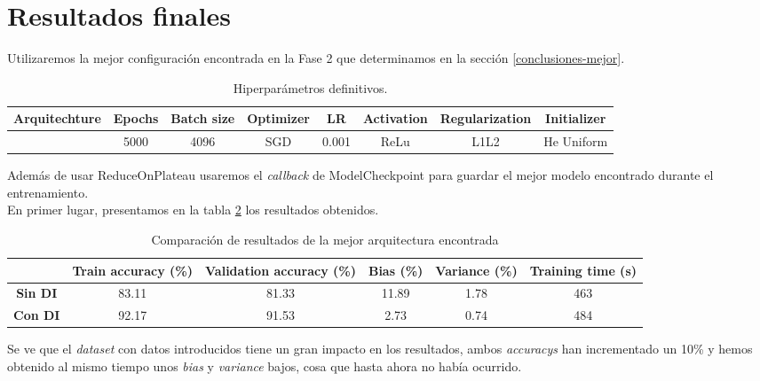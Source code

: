 \documentclass{article}
\begin{document}
\section{Resultados finales}
Utilizaremos la mejor configuraci\'on encontrada en la Fase 2 que determinamos en la secci\'on \ref{conclusiones-mejor}.\\
\begin{table}[h!]
    \begin{center}
    \begin{tabular}{| c | c | c | c | c | c | c | c |}
            \textbf{Arquitechture} & \textbf{Epochs} & \textbf{Batch size} & \textbf{Optimizer} & \textbf{LR} & \textbf{Activation} &\textbf{Regularization} & \textbf{Initializer}\\ \hline
            [32,16,8] & 5000 & 4096 & SGD & 0.001 & ReLu & L1L2 & He Uniform \\ \hline
        \end{tabular}
        \caption{Hiperpar\'ametros definitivos.}
        \label{tab:hip-j-a0-c}
    \end{center}
\end{table}
Adem\'as de usar ReduceOnPlateau usaremos el \textit{callback} de ModelCheckpoint para guardar el mejor modelo encontrado durante el entrenamiento.\\
En primer lugar, presentamos en la tabla \ref{tab:res-final} los resultados obtenidos.
			\begin{table}[!h]
				\begin{center}
					\begin{tabular}{ c | c | c | c | c | c |}
						\ & \textbf{Train accuracy (\%)} & \textbf{Validation accuracy (\%)} & \textbf{Bias (\%)} & \textbf{Variance (\%)} & \textbf{Training time (s)} \\ \hline
						\textbf{Sin DI} & 83.11 & 81.33 & 11.89 & 1.78 & 463\\ \hline
						\textbf{Con DI} & 92.17 & 91.53 & 2.73 & 0.74 & 484 \\ \hline
					\end{tabular}
					\caption{Comparaci\'on de resultados de la mejor arquitectura encontrada}
					\label{tab:res-final}
				\end{center}
			\end{table}
Se ve que el \textit{dataset} con datos introducidos tiene un gran impacto en los resultados, ambos \textit{accuracys} han incrementado un 10\% y hemos obtenido al mismo tiempo unos \textit{bias} y \textit{variance} bajos, cosa que hasta ahora no hab\'ia ocurrido.\\ \newpage
\end{document}
